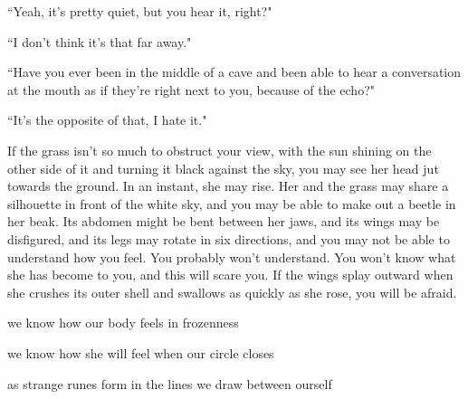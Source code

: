 \documentclass[11pt]{article}
\begin{document}
\begingroup
\begin{center}
``Yeah, it's pretty quiet, but you hear it, right?"
\end{center}
\endgroup

\begingroup
\begin{center}
``I don't think it's that far away."
\end{center}
\endgroup

\begingroup
\begin{center}
``Have you ever been in the middle of a cave and been able to hear a conversation at the mouth as if they're right next to you, because of the echo?"
\end{center}
\endgroup

\begingroup
\begin{center}
``It's the opposite of that, I hate it."
\end{center}
\endgroup

\vspace*{2\baselineskip}

\begingroup
If the grass isn't so much to obstruct your view, with the sun shining on the other side of it and turning it black against the sky, you may see her head jut towards the ground. In an instant, she may rise. Her and the grass may share a silhouette in front of the white sky, and you may be able to make out a beetle in her beak. Its abdomen might be bent between her jaws, and its wings may be disfigured, and its legs may rotate in six directions, and you may not be able to understand how you feel. You probably won't understand. You won't know what she has become to you, and this will scare you. If the wings splay outward when she crushes its outer shell and swallows as quickly as she rose, you will be afraid.
\endgroup

\vspace*{2\baselineskip}

\begingroup
\begin{center}
we know how our body feels in frozenness
\rightskip\leftskip
\end{center}
\endgroup

\begingroup
\begin{center}
we know how she will feel when our circle closes
\rightskip\leftskip
\end{center}
\endgroup

\begingroup
\begin{center}
as strange runes form in the lines we draw between ourself
\rightskip\leftskip
\end{center}
\endgroup
\end{document}

